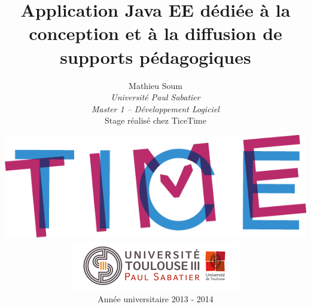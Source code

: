 \documentclass[xcolor=x11names,compress]{beamer}
\renewcommand{\(}{\begin{columns}}
\renewcommand{\)}{\end{columns}}
\newcommand{\<}[1]{\begin{column}{#1}}
\renewcommand{\>}{\end{column}}
\begin{document}
\begin{frame}
\title{Application Java EE dédiée à la conception et à la diffusion de supports
pédagogiques}
\author{
	Mathieu Soum\\
	{\it Université Paul Sabatier}\\
	{\it Master 1 -- Développement Logiciel}\\
    \vspace{5px}
	Stage réalisé chez TiceTime
  \vspace{-15px}
}
\date{
	{
	  \includegraphics[scale=0.13]{images/ticetime}\hspace{75px}\includegraphics[scale=0.37]{images/ups}
	}
	\\
	\vspace{15px}
	Année universitaire 2013 - 2014
}
\titlepage
\end{frame}

\begin{frame}
\tableofcontents
\end{frame}

\end{document}
